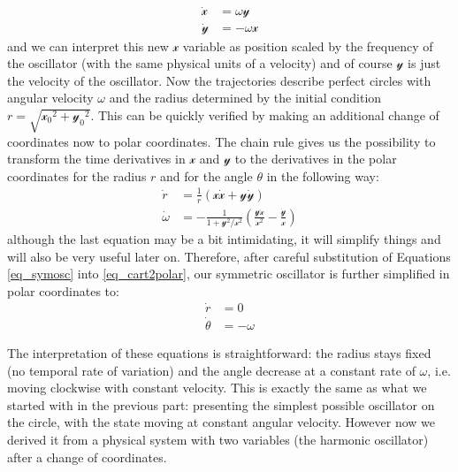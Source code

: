 \documentclass{article}
\begin{document}
\begin{subequations} \label{eq_symosc}
\begin{align}
    \dot{\mathscr{x}} & = \omega\mathscr{y} \\
    \dot{\mathscr{y}} & = -\omega \mathscr{x} 
\end{align}
\end{subequations}
and we can interpret this new $\mathscr{x}$ variable as position scaled by the frequency of the oscillator (with the same physical units of a velocity) and of course $\mathscr{y}$ is just the velocity of the oscillator. 
Now the trajectories describe perfect circles with angular velocity $\omega$ and the radius determined by the initial condition $r=\sqrt{\mathscr{x_0}^2+\mathscr{y_0}^2}$.
This can be quickly verified by making an additional change of coordinates now to polar coordinates.
The chain rule gives us the possibility to transform the time derivatives in $\mathscr{x}$ and $\mathscr{y}$ to the derivatives in the polar coordinates for the radius $r$ and for the angle $\theta$ in the following way:
\begin{subequations} \label{eq_cart2polar}
\begin{align}
    \dot{r} & = \frac{1}{r} (\mathscr{x}\dot{\mathscr{x}}+\mathscr{y}\dot{\mathscr{y}})\\
    \dot{\omega} & = - \frac{1}{1+\mathscr{y}^2/\mathscr{x}^2}\left(\frac{\mathscr{y}\dot{\mathscr{x}}}{\mathscr{x}^2} -  \frac{\dot{\mathscr{y}}}{\mathscr{x}} \right) 
\end{align}
\end{subequations}
although the last equation may be a bit intimidating, it will simplify things and will also be very useful later on.
Therefore, after careful substitution of Equations \ref{eq_symosc} into \ref{eq_cart2polar}, our symmetric oscillator is further simplified in polar coordinates to:
\begin{subequations} \label{eq_symoscpolar}
\begin{align}
    \dot{r} & = 0 \\
    \dot{\theta} & = -\omega 
\end{align}
\end{subequations}

The interpretation of these equations is straightforward: the radius stays fixed (no temporal rate of variation) and the angle decrease at a constant rate of $\omega$, i.e. moving clockwise with constant velocity. 
This is exactly the same as what we started with in the previous part: presenting the simplest possible oscillator on the circle, with the state moving at constant angular velocity.  
However now we derived it from a physical system with two variables (the harmonic oscillator) after a change of coordinates. 
\end{document}
